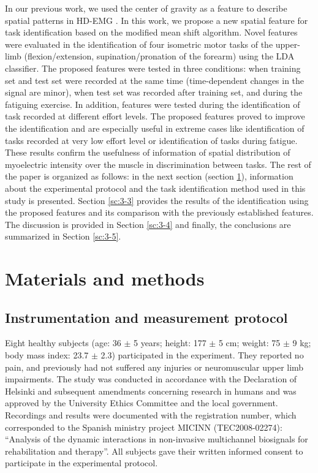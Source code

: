 In our previous work, we used the center of gravity as a feature to describe spatial patterns in HD-EMG \citep{Jordanic2016a, Jordanic2016b, Rojas-Martinez2013}. In this work, we propose a new spatial feature for task identification based on the modified mean shift algorithm. Novel features were evaluated in the identification of four isometric motor tasks of the upper-limb (flexion/extension, supination/pronation of the forearm) using the LDA classifier. The proposed features were tested in three conditions: when training set and test set were recorded at the same time (time-dependent changes in the signal are minor), when test set was recorded after training set, and during the fatiguing exercise. In addition, features were tested during the identification of task recorded at different effort levels. The proposed features proved to improve the identification and are especially useful in extreme cases like identification of tasks recorded at very low effort level or identification of tasks during fatigue. These results confirm the usefulness of information of spatial distribution of myoelectric intensity over the muscle in discrimination between tasks.
The rest of the paper is organized as follows: in the next section (section \ref{sc:3-2}), information about the experimental protocol and the task identification method used in this study is presented. Section \ref{sc:3-3} provides the results of the identification using the proposed features and its comparison with the previously established features. The discussion is provided in Section \ref{sc:3-4} and finally, the conclusions are summarized in Section \ref{sc:3-5}.\\
\clearpage

\section{Materials and methods} \label{sc:3-2}

\subsection{Instrumentation and measurement protocol}

Eight healthy subjects (age: 36 $\pm$ 5 years; height: 177 $\pm$ 5 cm; weight: 75 $\pm$ 9 kg; body mass index: 23.7 $\pm$ 2.3) participated in the experiment. They reported no pain, and previously had not suffered any injuries or neuromuscular upper limb impairments. The study was conducted in accordance with the Declaration of Helsinki and subsequent amendments concerning research in humans and was approved by the University Ethics Committee and the local government. Recordings and results were documented with the registration number, which corresponded to the Spanish ministry project MICINN (TEC2008-02274): “Analysis of the dynamic interactions in non-invasive multichannel biosignals for rehabilitation and therapy”. All subjects gave their written informed consent to participate in the experimental protocol.

